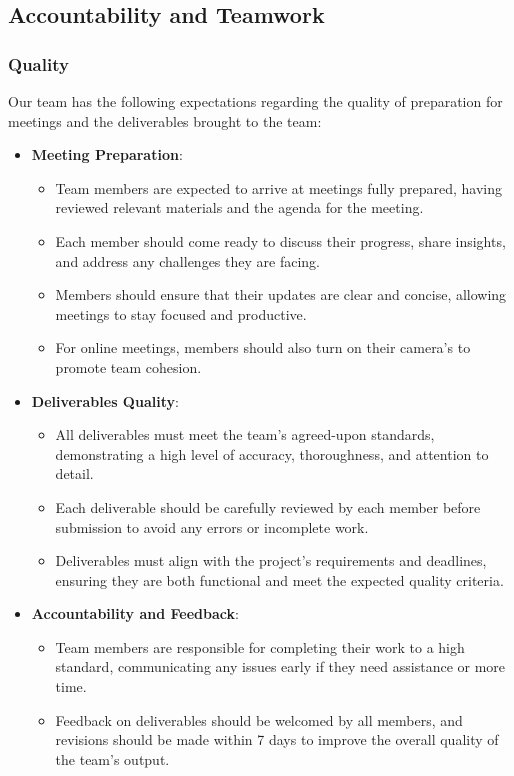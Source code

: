 \documentclass{article}
\begin{document}
\subsection*{Accountability and Teamwork}

\subsubsection*{Quality} 
Our team has the following expectations regarding the quality of preparation for meetings and the deliverables brought to the team:

\begin{itemize}
  \item \textbf{Meeting Preparation}:
    \begin{itemize}
      \item Team members are expected to arrive at meetings fully prepared, having reviewed relevant materials and the agenda for the meeting.
      \item Each member should come ready to discuss their progress, share insights, and address any challenges they are facing.
      \item Members should ensure that their updates are clear and concise, allowing meetings to stay focused and productive.
      \item For online meetings, members should also turn on their camera's to promote team cohesion.
    \end{itemize}

  \item \textbf{Deliverables Quality}:
    \begin{itemize}
      \item All deliverables must meet the team’s agreed-upon standards, demonstrating a high level of accuracy, thoroughness, and attention to detail.
      \item Each deliverable should be carefully reviewed by each member before submission to avoid any errors or incomplete work.
      \item Deliverables must align with the project's requirements and deadlines, ensuring they are both functional and meet the expected quality criteria.
    \end{itemize}

  \item \textbf{Accountability and Feedback}:
    \begin{itemize}
        \item Team members are responsible for completing their work to a high standard, communicating any issues early if they need assistance or more time.
        \item Feedback on deliverables should be welcomed by all members, and revisions should be made within 7 days to improve the overall quality of the team’s output.
    \end{itemize}

\end{itemize}
\end{document}
